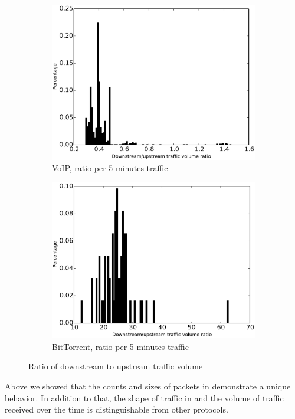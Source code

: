 \begin{figure}
\begin{subfigure}{0.16\linewidth}
\end{subfigure}
\begin{subfigure}{0.16\linewidth}
\includegraphics[width=\linewidth]{image/ratio_downstream_upstream_traffic_volume_voip.eps}
\caption{VoIP, ratio per 5 minutes traffic}
\label{ratio_downstream_upstream_traffic_volume_voip}
\end{subfigure}
\begin{subfigure}{0.16\linewidth}
\includegraphics[width=\linewidth]{image/ratio_downstream_upstream_traffic_volume_bittorrent.eps}
\caption{BitTorrent, ratio per 5 minutes traffic}
\label{ratio_downstream_upstream_traffic_volume_bittorrent}
\end{subfigure}
\caption{Ratio of downstream to upstream traffic volume}
\end{figure}
Above we showed that the counts and sizes of packets in \bc demonstrate a unique behavior. 
In addition to that, the shape of traffic in \bc and the volume of traffic received over the time  is distinguishable from other protocols.

